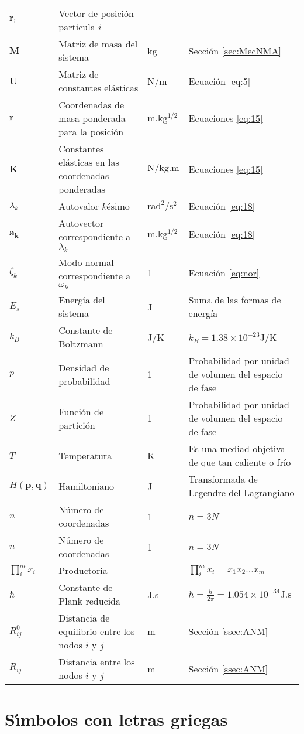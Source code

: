 \begin{longtable}{p{2cm}p{3.5cm}p{2cm}p{8cm}}
$\mathbf{r_i}$&Vector de posici\'{o}n part\'{i}cula $i$&-&-\\%
$\mathbf{M}$&Matriz de masa del sistema&kg&Secci\'{o}n \ref{sec:MecNMA}\\%
$\mathbf{U}$&Matriz de constantes el\'{a}sticas&N/m&Ecuaci\'{o}n \eqref{eq:5}\\%
$\mathbf{r}$&Coordenadas de masa ponderada para la posici\'{o}n&$\mathrm{m.kg^{1/2}}$ &Ecuaciones \eqref{eq:15}\\%
$\mathbf{K}$&Constantes el\'{a}sticas en las coordenadas ponderadas&$\mathrm{N/kg.m}$ &Ecuaciones \eqref{eq:15}\\%
$\lambda_k$&Autovalor $k$\'{e}simo &$\mathrm{rad^2/s^2}$&Ecuaci\'{o}n \eqref{eq:18}\\%
$\mathbf{a_k}$&Autovector correspondiente a $\lambda_k$&$\mathrm{m.kg^{1/2}}$ &Ecuaci\'{o}n \eqref{eq:18}\\%
$\zeta_k$   &Modo normal correspondiente a $\omega_k$&1 &Ecuaci\'{o}n \eqref{eq:nor}\\%
$E_s$&Energ\'{i}a del sistema &J  &Suma de las formas de energ\'{i}a\\%
$k_B$&Constante de Boltzmann &J/K&$k_B=1.38\times 10^{-23}$J/K\\%
$p$&Densidad de probabilidad &1 &Probabilidad por unidad de volumen del espacio de fase\\%
$Z$  &Funci\'{o}n de partici\'{o}n&1 &Probabilidad por unidad de volumen del espacio de fase\\%
$T$ &Temperatura &K &Es una mediad objetiva de que tan caliente o fr\'{i}o\\%
$H(\mathbf{p},\mathbf{q})$ &Hamiltoniano  &J &Transformada de Legendre del Lagrangiano\\%
$n$ &N\'{u}mero de coordenadas    &1 &$n=3N$\\%
$n$&N\'{u}mero de coordenadas   &1 &$n=3N$\\%
$\prod_i^m x_i$&Productoria&-&$\prod_i^m x_i=x_1x_2...x_m$\\%
$\hbar$&Constante de Plank reducida &J.s &$\hbar=\frac{h}{2\pi}=1.054\times 10^{-34}$J.s\\%
$R_{ij}^0$&Distancia de equilibrio entre los nodos $i$ y $j$ &m&Secci\'{o}n \ref{ssec:ANM}\\%
$R_{ij}$&Distancia entre los nodos $i$ y $j$ &m&Secci\'{o}n \ref{ssec:ANM}\\%
\end{longtable}
\vspace{5ex}
\section*{S\'{\i}mbolos con letras griegas}

